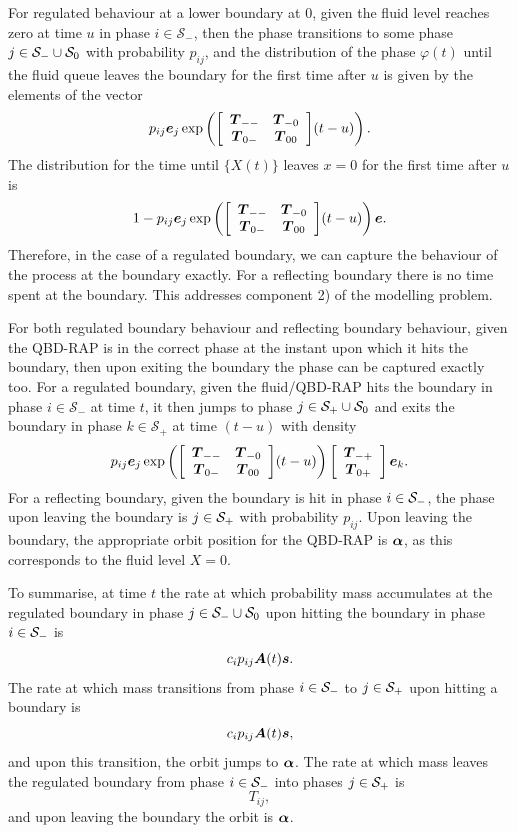 For regulated behaviour at a lower boundary at \(0\), given the fluid level reaches zero at time \(u\) in phase \(i\in\mathcal S_-\), then the phase transitions to some phase \(j\in\mathcal{S}_-\cup\mathcal{S}_0\) with probability \(p_{ij}\), and the distribution of the phase \(\varphi(t)\) until the fluid queue leaves the boundary for the first time after \(u\) is given by the elements of the vector
\[p_{ij} \boldsymbol e_j \exp\left({\left[\begin{array}{cc} \boldsymbol T_{--} & \boldsymbol T_{-0} \\ \boldsymbol T_{0-} & \boldsymbol T_{00}\end{array}\right]}(t-u)\right).\] 
The distribution for the time until \(\{X(t)\}\) leaves \(x=0\) for the first time after \(u\) is 
\[1-p_{ij}\boldsymbol e_j \exp\left({\left[\begin{array}{cc} \boldsymbol T_{--} & \boldsymbol T_{-0} \\ \boldsymbol T_{0-} & \boldsymbol T_{00}\end{array}\right]}(t-u)\right)\boldsymbol e.\] 
Therefore, in the case of a regulated boundary, we can capture the behaviour of the process at the boundary exactly. For a reflecting boundary there is no time spent at the boundary. This addresses component 2) of the modelling problem. 

For both regulated boundary behaviour and reflecting boundary behaviour, given the QBD-RAP is in the correct phase at the instant upon which it hits the boundary, then upon exiting the boundary the phase can be captured exactly too. For a regulated boundary, given the fluid/QBD-RAP hits the boundary in phase \(i\in\mathcal S_-\) at time \(t\), it then jumps to phase \(j\in\mathcal{S}_+\cup\mathcal{S}_0\) and exits the boundary in phase \(k\in\mathcal S_+\) at time \((t-u)\) with density 
\[p_{ij}\boldsymbol e_j \exp\left({\left[\begin{array}{cc} \boldsymbol T_{--} & \boldsymbol T_{-0} \\ \boldsymbol T_{0-} & \boldsymbol T_{00}\end{array}\right]}(t-u)\right)\left[\begin{array}{c} \boldsymbol T_{-+} \\ \boldsymbol T_{0+}\end{array}\right]\boldsymbol e_k.\] 
For a reflecting boundary, given the boundary is hit in phase \(i\in\mathcal{S}_-\), the phase upon leaving the boundary is \(j\in\mathcal{S}_+\) with probability \(p_{ij}\). Upon leaving the boundary, the appropriate orbit position for the QBD-RAP is \(\boldsymbol \alpha\), as this corresponds to the fluid level \(X=0\). 

To summarise, at time \(t\) the rate at which probability mass accumulates at the regulated boundary in phase \(j \in\mathcal{S}_-\cup\mathcal{S}_0\) upon hitting the boundary in phase \(i\in\mathcal{S}_-\) is 
\[ c_ip_{ij} \boldsymbol A(t)\boldsymbol s.\]
The rate at which mass transitions from phase \(i\in\mathcal{S}_-\) to \(j\in\mathcal{S}_+\) upon hitting a boundary is 
\[ c_ip_{ij} \boldsymbol A(t)\boldsymbol s,\]
and upon this transition, the orbit jumps to \(\boldsymbol \alpha\). 
The rate at which mass leaves the regulated boundary from phase \(i\in\mathcal{S}_-\) into phases \(j\in\mathcal{S}_+\) is 
\[T_{ij},\]
and upon leaving the boundary the orbit is \(\boldsymbol\alpha\). 

